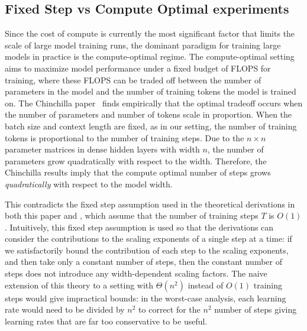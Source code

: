 \clearpage

\subsection{Fixed Step vs Compute Optimal experiments}
\label{app:fixed_vs_compute_opt}
Since the cost of compute is currently the most significant factor that limits the scale of large model training runs, the dominant paradigm for training large models in practice is the compute-optimal regime. The compute-optimal setting~\citep{kaplan2019notes} aims to maximize model performance under a fixed budget of FLOPS for training, where these FLOPS can be traded off between the number of parameters in the model and the number of training tokens the model is trained on. The Chinchilla paper~\citep{hoffmann2022training} finds empirically that the optimal tradeoff occurs when the number of parameters and number of tokens scale in proportion. When the batch size and context length are fixed, as in our setting, the number of training tokens is proportional to the number of training steps. Due to the $n \times n$ parameter matrices in dense hidden layers with width $n$, the number of parameters grow quadratically with respect to the width. Therefore, the Chinchilla results imply that the compute optimal number of steps grows \emph{quadratically} with respect to the model width.

This contradicts the fixed step assumption used in the theoretical derivations in both this paper and \citet{yang2021tensoriv,yang2023tensorivb}, which assume that the number of training steps $T$ is $O(1)$. Intuitively, this fixed step assumption is used so that the derivations can consider the contributions to the scaling exponents of a single step at a time: if we satisfactorily bound the contribution of each step to the scaling exponents, and then take only a constant number of steps, then the constant number of steps does not introduce any width-dependent scaling factors. The naive extension of this theory to a setting with $\Theta(n^2)$ instead of $O(1)$ training steps would give impractical bounds: in the worst-case analysis, each learning rate would need to be divided by $n^2$ to correct for the $n^2$ number of steps giving learning rates that are far too conservative to be useful.

